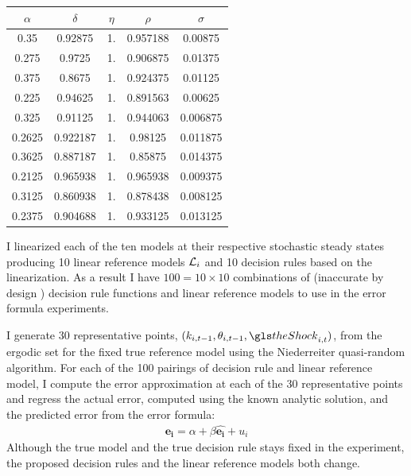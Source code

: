 \documentclass[12pt]{article}
\begin{document}
\vspace{.2in}



   \begin{tabular}{|c|c|c|c|c|}
\hline
\multicolumn{1}{|c|}{$\alpha$}&
\multicolumn{1}{|c|}{$\delta$}&
\multicolumn{1}{|c|}{$\eta$}&
\multicolumn{1}{|c|}{$\rho$}&
\multicolumn{1}{|c|}{$\sigma$}\\
\hline
                   0.35 & 0.92875 & 1. & 0.957188 & 0.00875 \\
\hline
                   0.275 & 0.9725 & 1. & 0.906875 & 0.01375 \\
\hline
                   0.375 & 0.8675 & 1. & 0.924375 & 0.01125 \\
\hline
                   0.225 & 0.94625 & 1. & 0.891563 & 0.00625 \\
\hline
                   0.325 & 0.91125 & 1. & 0.944063 & 0.006875 \\
\hline
                   0.2625 & 0.922187 & 1. & 0.98125 & 0.011875 \\
\hline
                   0.3625 & 0.887187 & 1. & 0.85875 & 0.014375 \\
\hline
                   0.2125 & 0.965938 & 1. & 0.965938 & 0.009375 \\
\hline
                   0.3125 & 0.860938 & 1. & 0.878438 & 0.008125 \\
\hline
                   0.2375 & 0.904688 & 1. & 0.933125 & 0.013125 \\
\hline
                  \end{tabular}


\vspace{.2in}



I linearized each of the ten models at their respective stochastic steady
states producing 10 linear reference models ${\mathcal{L}}_i$ and 10 decision rules
based on the linearization. 
As a result I have $100=10 \times 10$ combinations of (inaccurate by design ) decision rule functions
 and
linear reference models to use in the error formula experiments.


I generate 30 representative points, $(k_{i,t-1},\theta_{i,t-1},\theShock_{i,t})$, from the ergodic set for the fixed true reference model
using the Niederreiter quasi-random algorithm.
For each of the 100 pairings of decision rule and linear reference model,
I compute the error approximation at each of the 30 representative points
and regress the actual error, computed using the known analytic solution, and the predicted error from the error formula:
\begin{gather*}
  \mathbf{e_i}=\alpha + \beta   \hat{\mathbf{e_i}} +u_i
\end{gather*}
Although the true model and the true decision rule stays 
fixed in the experiment, the
  proposed decision rules and the linear reference models both change.
\end{document}
